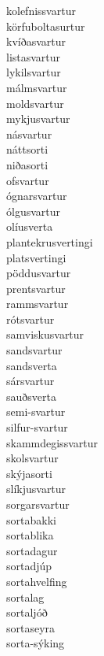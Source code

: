 \documentclass[../samsetningasafn.tex]{subfiles}
\begin{document}
\begin{bigwordlist}
\begin{footnotesize}
\begin{multicols}{4}
\begin{description}
		\item [kolefnissvartur]
		\item [körfuboltasurtur]
		\item [kvíðasvartur]
		\item [listasvartur]
		\item [lykilsvartur]
		\item [málmsvartur]
		\item [moldsvartur]
		\item [mykjusvartur]
		\item [násvartur]
		\item [náttsorti]
		\item [niðasorti]
		\item [ofsvartur]
		\item [ógnarsvartur]
		\item [ólgusvartur]
		\item [olíusverta]
		\item [plantekrusvertingi]
		\item [platsvertingi]
		\item [pöddusvartur]
		\item [prentsvartur]
		\item [rammsvartur]
		\item [rótsvartur]
		\item [samviskusvartur]
		\item [sandsvartur]
		\item [sandsverta]
		\item [sársvartur]
		\item [sauðsverta]
		\item [semi-svartur]
		\item [silfur-svartur]
		\item [skammdegissvartur]
		\item [skolsvartur]
		\item [skýjasorti]
		\item [slíkjusvartur]
		\item [sorgarsvartur]
		\item [sortabakki]
		\item [sortablika]
		\item [sortadagur]
		\item [sortadjúp]
		\item [sortahvelfing]
		\item [sortalag]
		\item [sortaljóð]
		\item [sortaseyra]
		\item [sorta-sýking]

\end{description}
\end{multicols}
\end{footnotesize}
\end{bigwordlist}
\end{document}
